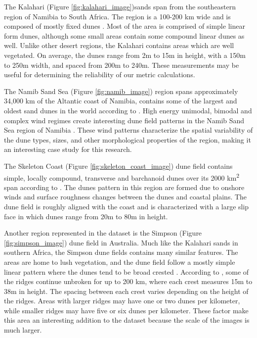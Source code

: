 The Kalahari (Figure \ref{fig:kalahari_image})sands span from the southeastern region of Namibia to South Africa. The region is a 100-200 km wide and is composed of mostly fixed dunes \cite{lancaster_linear_dunes_kalahari}. Most of the area is comprised of simple linear form dunes, although some small areas contain some compound linear dunes as well. Unlike other desert regions, the Kalahari contains areas which are well vegetated. On average, the dunes range from 2m to 15m in height, with a 150m to 250m width, and spaced from 200m to 240m. These measurements may be useful for determining the reliability of our metric calculations.

The Namib Sand Sea (Figure \ref{fig:namib_image}) region spans approximately 34,000 km of the Altantic coast of Namibia, contains some of the largest and oldest sand dunes in the world according to \cite{goodie_namib_sand_sea_ancient_desert}. High energy unimodal, bimodal and complex wind regimes create interesting dune field patterns in the Namib Sand Sea region of Namibia \cite{lancaster_winds_sand_movement_namib_sea}. These wind patterns characterize the spatial variability of the dune types, sizes, and other morphological properties of the region, making it an interesting case study for this research.

The Skeleton Coast (Figure \ref{fig:skeleton_coast_image}) dune field contains simple, locally compound, transverse and barchanoid dunes over its 2000 km\textsuperscript{2} span according to \cite{lancaster_dunes_skeleton_coast}. The dunes pattern in this region are formed due to onshore winds and surface roughness changes between the dunes and coastal plains. The dune field is roughly aligned with the coast and is characterized with a large slip face in which dunes range from 20m to 80m in height.

Another region represented in the dataset is the Simpson (Figure \ref{fig:simpson_image}) dune field in Australia. Much like the Kalahari sands in southern Africa, the Simpson dune fields contains many similar features. The areas are home to lush vegetation, and the dune field follow a mostly simple linear pattern where the dunes tend to be broad crested \cite{hesse_australian_desert_dunefields}. According to \cite{twidale_simpson_desert_australia}, some of the ridges continue unbroken for up to 200 km, where each crest measures 15m to 38m in height. The spacing between each crest varies depending on the height of the ridges. Areas with larger ridges may have one or two dunes per kilometer, while smaller ridges may have five or six dunes per kilometer. These factor make this area an interesting addition to the dataset because the scale of the images is much larger.

